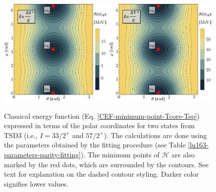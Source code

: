 \begin{figure}
    \centering
    \includegraphics[width=0.49\textwidth]{Chapters/Figures/parity-partners-plots/contour-tsd3-1.pdf}
    \includegraphics[width=0.49\textwidth]{Chapters/Figures/parity-partners-plots/contour-tsd3-2.pdf}
    \caption{Classical energy function (Eq. \ref{CEF-minimum-point-Tcore-Tsp}) expressed in terms of the polar coordinates for two states from TSD3 (i.e., $I=33/2^+$ and $57/2^+$). The calculations are done using the parameters obtained by the fitting procedure (see Table \ref{lu163-parameters-parity-fitting}). The minimum points of $\mathcal{H}$ are also marked by the red dots, which are surrounded by the contours. See text for explanation on the dashed contour styling. Darker color signifies lower values.}
    \label{contour-cef-polar-tsd3}
\end{figure}
